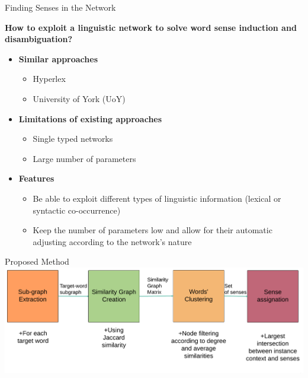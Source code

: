 \documentclass[10pt,xcolor=table]{beamer}
\begin{document}
\begin{frame}{Finding Senses in the Network}

	\large  \textbf{How to exploit a linguistic network to solve word sense induction and disambiguation?}
	\vspace{.5cm}
	\normalsize
	\begin{itemize}
		\item \textbf{Similar approaches}
			\begin{itemize}
				\item Hyperlex \cite{2004.Veronis}
				\item University of York (UoY) \cite{2007.Klapaftis.UOY}
			\end{itemize}
		\item \textbf{Limitations of existing approaches}
		\begin{itemize}
			\item Single typed networks
			\item Large number of parameters
		\end{itemize}
		\item \textbf{Features}
		\begin{itemize}
				\item Be able to exploit different types of linguistic information (lexical or syntactic co-occurrence)
				\item Keep  the number of parameters low and allow for their automatic adjusting according to the network's nature
		
		\end{itemize}
\end{itemize}
\vspace{\textheight}	
\end{frame}
\begin{frame}{Proposed Method}
  \centering
  \includegraphics[width=1\linewidth]{img/wsd_wsi.png}

\end{frame}
\end{document}
